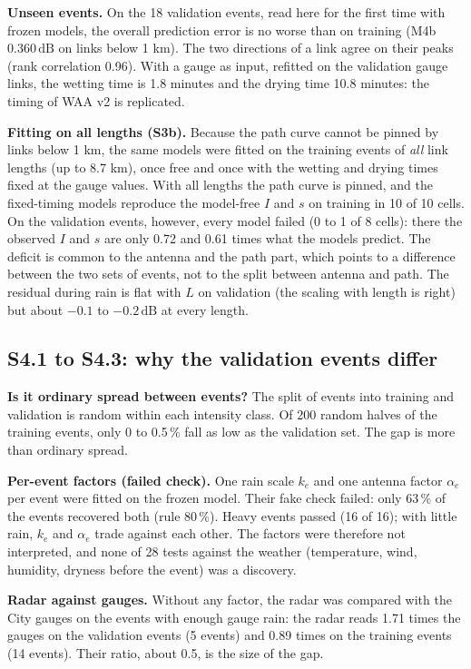 \documentclass[11pt,a4paper]{article}
\newcommand{\dB}{\,\mathrm{dB}}
\begin{document}
\textbf{Unseen events.} On the 18 validation events, read here for the first time with frozen models, the overall
prediction error is no worse than on training (M4b 0.360$\dB$ on links below 1 km). The two directions of a link agree
on their peaks (rank correlation 0.96). With a gauge as input, refitted on the validation gauge links, the wetting
time is 1.8 minutes and the drying time 10.8 minutes: the timing of WAA v2 is replicated.

\textbf{Fitting on all lengths (S3b).} Because the path curve cannot be pinned by links below 1 km, the same models
were fitted on the training events of \emph{all} link lengths (up to 8.7 km), once free and once with the wetting and
drying times fixed at the gauge values. With all lengths the path curve is pinned, and the fixed-timing models
reproduce the model-free $I$ and $s$ on training in 10 of 10 cells. On the validation events, however, every model
failed (0 to 1 of 8 cells): there the observed $I$ and $s$ are only 0.72 and 0.61 times what the models predict. The
deficit is common to the antenna and the path part, which points to a difference between the two sets of events, not
to the split between antenna and path. The residual during rain is flat with $L$ on validation (the scaling with
length is right) but about $-0.1$ to $-0.2\dB$ at every length.

\subsection{S4.1 to S4.3: why the validation events differ}
\label{sec:s4}

\textbf{Is it ordinary spread between events?} The split of events into training and validation is random within
each intensity class. Of 200 random halves of the training events, only 0 to 0.5\,\% fall as low as the validation
set. The gap is more than ordinary spread.

\textbf{Per-event factors (failed check).} One rain scale $k_e$ and one antenna factor $\alpha_e$ per event were
fitted on the frozen model. Their fake check failed: only 63\,\% of the events recovered both (rule 80\,\%). Heavy
events passed (16 of 16); with little rain, $k_e$ and $\alpha_e$ trade against each other. The factors were therefore
not interpreted, and none of 28 tests against the weather (temperature, wind, humidity, dryness before the event)
was a discovery.

\textbf{Radar against gauges.} Without any factor, the radar was compared with the City gauges on the events with
enough gauge rain: the radar reads 1.71 times the gauges on the validation events (5 events) and 0.89 times on the
training events (14 events). Their ratio, about 0.5, is the size of the gap.
\end{document}
